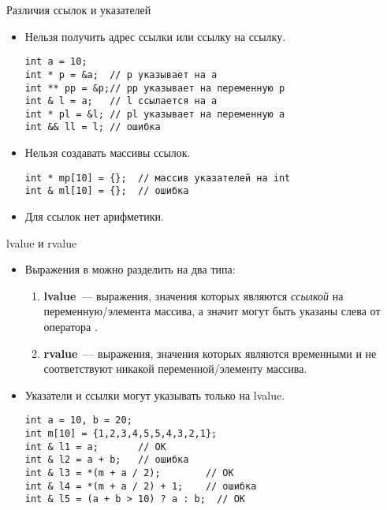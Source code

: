 \documentclass{beamer}
\begin{document}
\begin{frame}[fragile]{Различия ссылок и указателей}
    \begin{itemize}
        \item Нельзя получить адрес ссылки или ссылку на ссылку.
\begin{lstlisting}
int a = 10;
int * p = &a;  // p указывает на a
int ** pp = &p;// pp указывает на переменную p
int & l = a;   // l ссылается на a
int * pl = &l; // pl указывает на переменную a
int && ll = l; // ошибка
\end{lstlisting}

        \item Нельзя создавать массивы ссылок.
\begin{lstlisting}
int * mp[10] = {};  // массив указателей на int
int & ml[10] = {};  // ошибка
\end{lstlisting}

        \item Для ссылок нет арифметики.

    \end{itemize}
\end{frame}

\begin{frame}[fragile]{lvalue и rvalue}
    \begin{itemize}
        \item Выражения в \langcpp можно разделить на два типа:
            \begin{enumerate}
                \item {\bf lvalue}~--- выражения, значения которых являются
                    {\em ссылкой} на переменную/элемента массива, 
                    а значит могут быть указаны слева от оператора \code{=}.
                    
                \item {\bf rvalue}~--- выражения, значения которых являются
                    временными и не соответствуют никакой переменной/элементу
                    массива.
            \end{enumerate}

        \item Указатели и ссылки могут указывать только на lvalue.
\begin{lstlisting}
int a = 10, b = 20;
int m[10] = {1,2,3,4,5,5,4,3,2,1};
int & l1 = a;       // OK
int & l2 = a + b;   // ошибка
int & l3 = *(m + a / 2);        // OK
int & l4 = *(m + a / 2) + 1;    // ошибка
int & l5 = (a + b > 10) ? a : b;  // OK
\end{lstlisting}
\end{itemize}
\end{frame}
\end{document}
